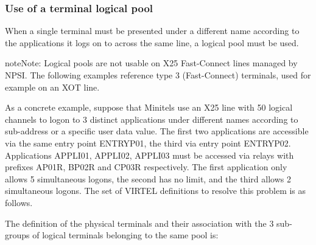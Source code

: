 \documentclass[letterpaper,10pt,english]{sphinxmanual}
\begin{document}
\subsubsection{Use of a terminal logical pool}
\label{\detokenize{connectivity_guide:use-of-a-terminal-logical-pool}}
When a single terminal must be presented under a different name according to the applications it logs on to across the same line, a logical pool must be used.

\begin{sphinxadmonition}{note}{Note:}
Logical pools are not usable on X25 Fast-Connect lines managed by NPSI. The following examples reference type 3 (Fast-Connect) terminals, used for example on an XOT line.
\end{sphinxadmonition}

As a concrete example, suppose that Minitels use an X25 line with 50 logical channels to logon to 3 distinct applications under different names according to sub-address or a specific user data value. The first two applications are accessible via the same entry point ENTRYP01, the third via entry point ENTRYP02. Applications APPLI01, APPLI02, APPLI03 must be accessed via relays with prefixes AP01R, BP02R and CP03R respectively. The first application only allows 5 simultaneous logons, the second has no limit, and the third allows 2 simultaneous logons. The set of VIRTEL definitions to resolve this problem is as follows.


The definition of the physical terminals and their association with the 3 sub-groups of logical terminals belonging to the same pool is:

\begin{sphinxVerbatim}[commandchars=\\\{\}]
   
                    

                     

      
                    

                     
                     
                     
\end{sphinxVerbatim}
\end{document}

